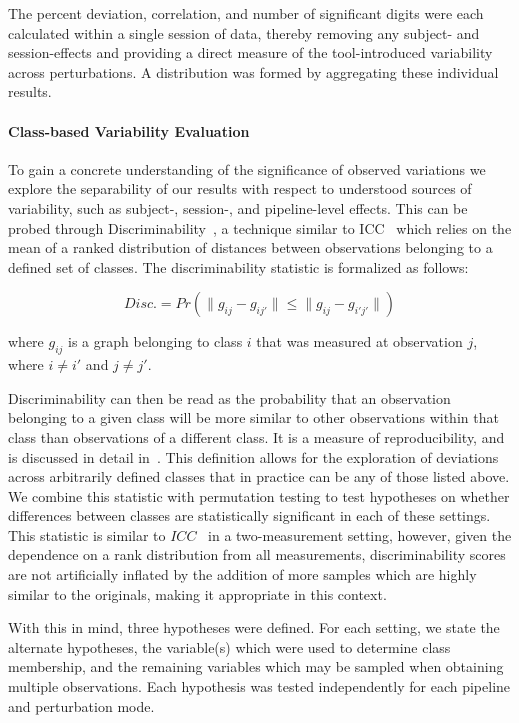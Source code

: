 \documentclass[fleqn,10pt]{SelfArx} %
\newcommand{\new}[1]{{#1}}
\begin{document}
The percent deviation, correlation, and number of significant digits were each calculated within a single session of
data, thereby removing any subject- and session-effects and providing a direct measure of the tool-introduced
variability across perturbations. A distribution was formed by aggregating these individual results.

\paragraph{Class-based Variability Evaluation} To gain a concrete understanding of the significance of observed
variations we explore the separability of our results with respect to understood sources of variability, such as 
subject-, session-, and pipeline-level effects. This can be probed through Discriminability~\cite{bridgeford2020elim},
a technique similar to ICC~\cite{Bartko1966-tl} which relies on the mean of a ranked distribution of distances between
observations belonging to a defined set of classes. The discriminability statistic is formalized as follows:

\begin{equation}
Disc. = Pr(\lVert g_{ij} - g_{ij'} \rVert \leq \lVert g_{ij} - g_{i'j'} \rVert)
\label{eq:sigdig}
\end{equation}

where $g_{ij}$ is a graph belonging to class $i$ that was measured at observation $j$, where $i \neq i'$ and
$j \neq j'$.

Discriminability can then be read as the probability that an observation belonging to a given class will be more
similar to other observations within that class than observations of a different class. It is a measure of
reproducibility, and is discussed in detail in~\cite{bridgeford2020elim}. This definition allows for the exploration of
deviations across arbitrarily defined classes that in practice can be any of those listed above. We combine this
statistic with permutation testing to test hypotheses on whether differences between classes are statistically
significant in each of these settings. \new{This statistic is similar to $ICC$~\cite{Bartko1966-tl} in a two-measurement
setting, however, given the dependence on a rank distribution from all measurements, discriminability scores are not
artificially inflated by the addition of more samples which are highly similar to the originals, making it appropriate
in this context.}

With this in mind, three hypotheses were defined. For each setting, we state the alternate hypotheses, the variable(s)
which were used to determine class membership, and the remaining variables which may be sampled when obtaining multiple
observations. Each hypothesis was tested independently for each pipeline and perturbation mode.
\end{document}
